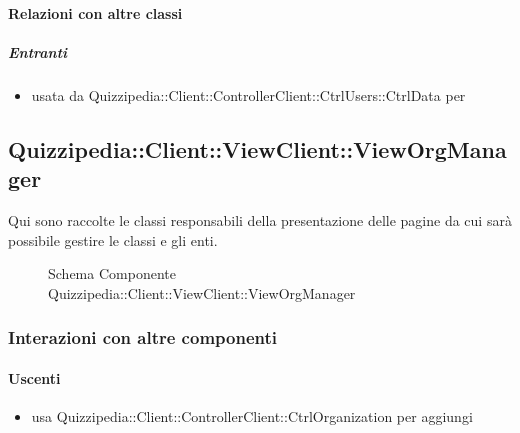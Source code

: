 \paragraph{Relazioni con altre classi}
\subparagraph{Entranti}
\begin{itemize}
\item usata da Quizzipedia::Client::ControllerClient::CtrlUsers::CtrlData per 
\end{itemize}
\subsection{Quizzipedia::Client::ViewClient::ViewOrgManager}
Qui sono raccolte le classi responsabili della presentazione delle pagine da cui sarà possibile gestire le classi e gli enti.
\begin{figure}[H]
\centering
\noindent{}
\caption[Schema Componente Quizzipedia::Client::ViewClient::ViewOrgManager]{Schema Componente Quizzipedia::Client::ViewClient::ViewOrgManager}
\end{figure}
\subsubsection{Interazioni con altre componenti}
\paragraph{Uscenti}
\begin{itemize}
\item usa Quizzipedia::Client::ControllerClient::CtrlOrganization per aggiungi
\end{itemize}

